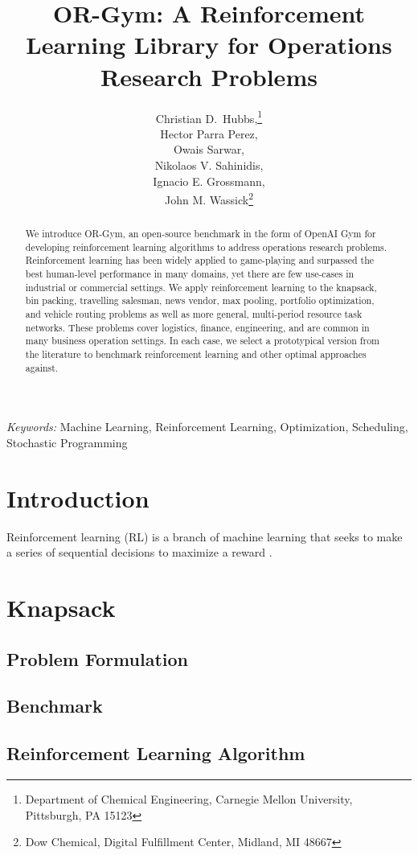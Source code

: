 \documentclass[12pt]{article}
\title{OR-Gym: A Reinforcement Learning Library for Operations Research Problems}
\author{
	Christian D.~Hubbs,\thanks{Department of Chemical Engineering, Carnegie Mellon University, Pittsburgh, PA 15123} \\
	Hector Parra Perez,\footnotemark[1] \\
	Owais Sarwar,\footnotemark[1]\\
	Nikolaos V. Sahinidis,\footnotemark[1] \\
	Ignacio E. Grossmann,\footnotemark[1] \\
	John M. Wassick\thanks{Dow Chemical, Digital Fulfillment Center, Midland, MI 48667}
}
\providecommand{\keywords}[1]{\textit{Keywords:} #1}
\begin{document}
\maketitle

\begin{abstract}
We introduce OR-Gym, an open-source benchmark in the form of OpenAI Gym for developing reinforcement learning algorithms to address operations research problems.
Reinforcement learning has been widely applied to game-playing and surpassed the best human-level performance in many domains, yet there are few use-cases in industrial or commercial settings.
We apply reinforcement learning to the knapsack, bin packing, travelling salesman, news vendor, max pooling, portfolio optimization, and vehicle routing problems as well as more general, multi-period resource task networks. 
These problems cover logistics, finance, engineering, and are common in many business operation settings.
In each case, we select a prototypical version from the literature to benchmark reinforcement learning and other optimal approaches against. 
\end{abstract}

\keywords{Machine Learning, Reinforcement Learning, Optimization, Scheduling, Stochastic Programming}

\section{Introduction}

Reinforcement learning (RL) is a branch of machine learning that seeks to make a series of sequential decisions to maximize a reward \citep{Sutton2018}. 

\section{Knapsack}

\subsection{Problem Formulation}

\subsection{Benchmark}

\subsection{Reinforcement Learning Algorithm}
\end{document}
